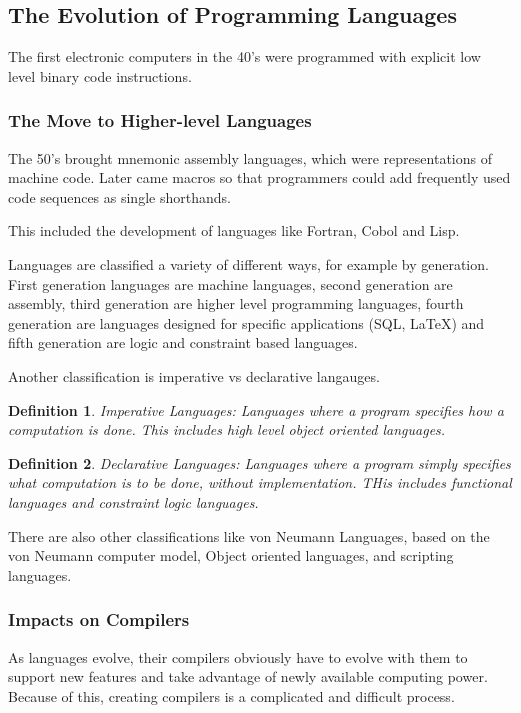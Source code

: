 \documentclass[titlepage]{article}
\newtheorem{definition}{Definition}
\begin{document}
\subsection{The Evolution of Programming Languages}
The first electronic computers in the 40's were programmed with explicit low level binary code instructions.
\subsubsection*{The Move to Higher-level Languages}
The 50's brought mnemonic assembly languages, which were representations of machine code. Later came macros so that programmers could add frequently used code sequences as single shorthands.

This included the development of languages like Fortran, Cobol and Lisp.

Languages are classified a variety of different ways, for example by generation. First generation languages are machine languages, second generation are assembly, third generation are higher level programming languages, fourth generation are languages designed for specific applications (SQL, \LaTeX) and fifth generation are logic and constraint based languages.

Another classification is imperative vs declarative langauges.

\begin{definition}
    \emph{Imperative Languages}: Languages where a program specifies how a computation is done. This includes high level object oriented languages.
\end{definition}
\begin{definition}
    \emph{Declarative Languages}: Languages where a program simply specifies what computation is to be done, without implementation. THis includes functional languages and constraint logic languages.
\end{definition}

There are also other classifications like von Neumann Languages, based on the von Neumann computer model, Object oriented languages, and scripting languages.

\subsubsection*{Impacts on Compilers}
As languages evolve, their compilers obviously have to evolve with them to support new features and take advantage of newly available computing power. Because of this, creating compilers is a complicated and difficult process.
\end{document}
